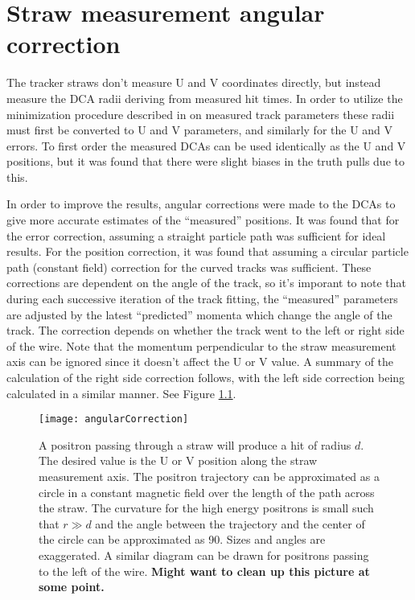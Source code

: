 
\thispagestyle{myheadings}

\graphicspath{{Body/Figures/TrackingFigures/CoordSys/}}

\chapter{Straw measurement angular correction}
\label{app:angularcorrection}


The tracker straws don't measure U and V coordinates directly, but instead measure the DCA radii deriving from measured hit times. In order to utilize the minimization procedure described in  on measured track parameters these radii must first be converted to U and V parameters, and similarly for the U and V errors. To first order the measured DCAs can be used identically as the U and V positions, but it was found that there were slight biases in the truth pulls due to this.

In order to improve the results, angular corrections were made to the DCAs to give more accurate estimates of the ``measured'' positions. It was found that for the error correction, assuming a straight particle path was sufficient for ideal results. For the position correction, it was found that assuming a circular particle path (constant field) correction for the curved tracks was sufficient. These corrections are dependent on the angle of the track, so it's imporant to note that during each successive iteration of the track fitting, the ``measured'' parameters are adjusted by the latest ``predicted'' momenta which change the angle of the track. The correction depends on whether the track went to the left or right side of the wire. Note that the momentum perpendicular to the straw measurement axis can be ignored since it doesn't affect the U or V value. A summary of the calculation of the right side correction follows, with the left side correction being calculated in a similar manner. See Figure \ref{fig:angularCorrection}. 

\begin{figure}[]
	\centering
	\texttt{[image: angularCorrection]}
	\caption[Angular correction for measured DCAs]{A positron passing through a straw will produce a hit of radius $d$. The desired value is the U or V position along the straw measurement axis. The positron trajectory can be approximated as a circle in a constant magnetic field over the length of the path across the straw. The curvature for the high energy positrons is small such that $r \gg d$ and the angle between the trajectory and the center of the circle can be approximated as 90\textdegree{}. Sizes and angles are exaggerated. A similar diagram can be drawn for positrons passing to the left of the wire. \textbf{Might want to clean up this picture at some point.}}
	\label{fig:angularCorrection}
\end{figure}

